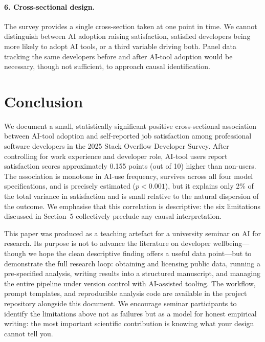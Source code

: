 \documentclass[11pt]{article}
\begin{document}
\paragraph{6. Cross-sectional design.}
The survey provides a single cross-section taken at one point in time. We
cannot distinguish between AI adoption raising satisfaction, satisfied
developers being more likely to adopt AI tools, or a third variable driving
both. Panel data tracking the same developers before and after AI-tool
adoption would be necessary, though not sufficient, to approach causal
identification.

\section{Conclusion}

We document a small, statistically significant positive cross-sectional
association between AI-tool adoption and self-reported job satisfaction among
professional software developers in the 2025 Stack Overflow Developer Survey.
After controlling for work experience and developer role, AI-tool users report
satisfaction scores approximately 0.155 points (out of 10) higher than
non-users. The association is monotone in AI-use frequency, survives across
all four model specifications, and is precisely estimated ($p < 0.001$), but
it explains only 2\% of the total variance in satisfaction and is small
relative to the natural dispersion of the outcome. We emphasise that this
correlation is descriptive: the six limitations discussed in Section~5
collectively preclude any causal interpretation.

This paper was produced as a teaching artefact for a university seminar on AI
for research. Its purpose is not to advance the literature on developer
wellbeing---though we hope the clean descriptive finding offers a useful
data point---but to demonstrate the full research loop: obtaining and
licensing public data, running a pre-specified analysis, writing results into
a structured manuscript, and managing the entire pipeline under version
control with AI-assisted tooling. The workflow, prompt templates, and
reproducible analysis code are available in the project repository alongside
this document. We encourage seminar participants to identify the limitations
above not as failures but as a model for honest empirical writing: the most
important scientific contribution is knowing what your design cannot tell you.



\end{document}
